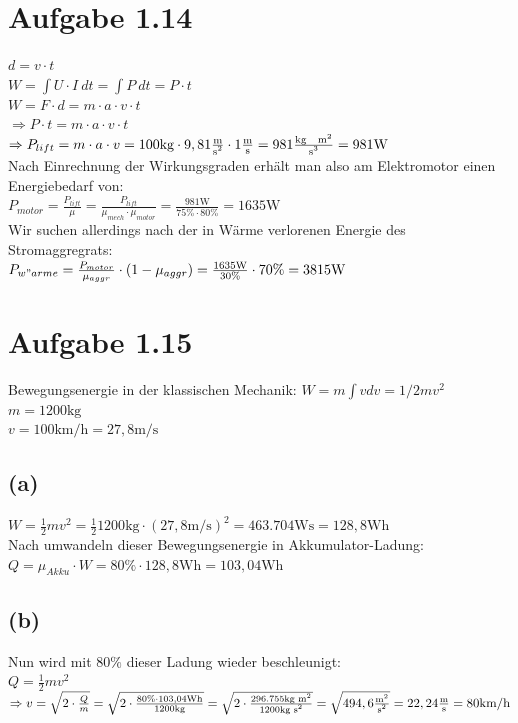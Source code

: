 \documentclass[]{article}
\newcommand{\rarr}{\Rightarrow}
\newcommand{\unit}[1]{\text{#1}}
\newcommand{\fracunit}[2]{\frac{\unit{#1}}{\unit{#2}}}
\newcommand{\textsq}[1]{\ensuremath{\text{#1}^2}}
\newcommand{\textpow}[2]{\ensuremath{\text{#1}^{#2}}}
\begin{document}
\section*{Aufgabe 1.14}
\par
	$d = v \cdot t$\\
	$W = \int U\cdot I ~dt = \int P ~dt = P \cdot t$\\
	$W = F \cdot d = m \cdot a \cdot v \cdot t$\\
	$\rarr P \cdot t = m \cdot a \cdot v \cdot t$\\
	$\rarr P_{lift} = m \cdot a \cdot v = 100\unit{kg} \cdot 9,81\fracunit{m}{\textsq{s}} \cdot 1\fracunit{m}{s} = 981\fracunit{kg ~ \textsq{m}}{\textpow{s}{3}} = 981 \unit{W}$\\
	Nach Einrechnung der Wirkungsgraden erhält man also am Elektromotor einen Energiebedarf von:\\
	$P_{motor} = \frac{P_{lift}}{\mu} = \frac{P_{lift}}{\mu_{mech} \cdot \mu_{motor}} = \frac{981 \unit{W}}{75\% \cdot 80\%} = 1635\unit{W}$\\
	Wir suchen allerdings nach der in Wärme verlorenen Energie des Stromaggregrats:\\
	$P_{w"arme} = \frac{P_{motor}}{\mu_{aggr}} \cdot (1-\mu_{aggr}) = \frac{1635\unit{W}}{30\%} \cdot 70\% = 3815\unit{W}$

\section*{Aufgabe 1.15}
\par
	Bewegungsenergie in der klassischen Mechanik: $W = m \int v dv = 1/2 m v^2$\\
	$m = 1200\unit{kg}$\\
	$v = 100\unit{km/h} = 27,8\unit{m/s}$
\subsection*{(a)}
	$W = \frac{1}{2} m v^2 = \frac{1}{2} 1200\unit{kg} \cdot (27,8\unit{m/s})^2 = 463.704\unit{Ws} = 128,8 \unit{Wh}$\\
	Nach umwandeln dieser Bewegungsenergie in Akkumulator-Ladung:\\
	$Q = \mu_{Akku} \cdot W = 80\% \cdot 128,8 \unit{Wh} = 103,04\unit{Wh}$
\subsection*{(b)}
	Nun wird mit $80\%$ dieser Ladung wieder beschleunigt:\\
	$Q = \frac{1}{2} m v^2$\\
	$\rarr v = \sqrt{ 2 \cdot \frac{Q}{m}} = \sqrt{2\cdot \frac{80\% \cdot 103,04\unit{Wh}}{1200\unit{kg}}} = \sqrt{2\cdot \frac{296.755\unit{kg~\textsq{m}}}{1200\unit{kg~\textsq{s}}}} = \sqrt{494,6 \fracunit{\textsq{m}}{\textsq{s}}} = 22,24 \fracunit{m}{s} = 80\unit{km/h}$
\end{document}
